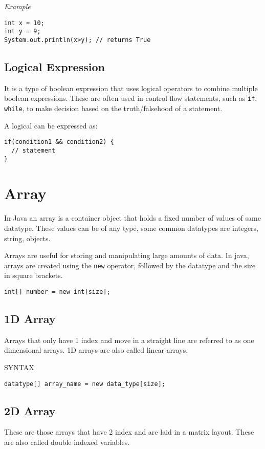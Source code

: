\documentclass[a4paper, 12pt]{scrarticle}
\begin{document}
\emph{Example}
\begin{verbatim}
int x = 10;
int y = 9;
System.out.println(x>y); // returns True
\end{verbatim}

\subsection{Logical Expression}
It is a type of boolean expression that uses logical operators to combine multiple boolean expressions. These are often used in control flow statements, such as \verb+if+, \verb+while+, to make decision based on the truth/falsehood of a statement.

A logical can be expressed as:
\begin{verbatim}
if(condition1 && condition2) {
  // statement
}
\end{verbatim}

\section{Array}
In Java an array is a container object that holds a fixed number of values of same datatype. These values can be of any type, some common datatypes are integers, string, objects.

Arrays are useful for storing and manipulating large amounts of data. In java, arrays are created using the \verb+new+ operator, followed by the datatype and the size in square brackets.

\begin{verbatim}
int[] number = new int[size];
\end{verbatim}

\subsection{1D Array}
Arrays that only have 1 index and move in a straight line are referred to as one dimensional arrays. 1D arrays are also called linear arrays.

SYNTAX

\verb+datatype[] array_name = new data_type[size];+

\subsection{2D Array}
These are those arrays that have 2 index and are laid in a matrix layout. These are also called double indexed variables.
\end{document}
